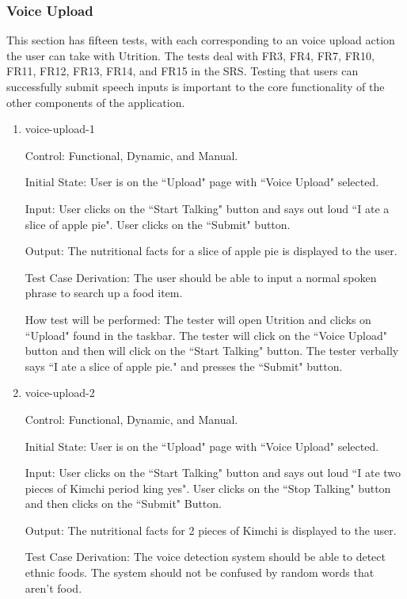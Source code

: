 \documentclass[12pt, titlepage]{article}
\begin{document}
	\subsubsection{Voice Upload}
	This section has fifteen tests, with each corresponding to an voice upload action the user can take with Utrition. The tests deal with FR3, FR4, FR7, FR10, FR11, FR12, FR13, FR14, and FR15 in the SRS. 
	Testing that users can successfully submit speech inputs is 
	important to the core functionality of the other components of the 
	application.
	
	\begin{enumerate}
	\item{voice-upload-1\\}
	
	Control: Functional, Dynamic, and Manual.
	
	Initial State: User is on the ``Upload" page with ``Voice Upload" selected.
	
	Input: User clicks on the ``Start Talking" button and says out loud ``I ate a slice of apple pie". User clicks on the ``Submit" button.
	
	Output: The nutritional facts for a slice of apple pie is displayed to the user.
	
	Test Case Derivation: The user should be able to input a normal spoken phrase to search up a food item.
	
	How test will be performed: The tester will open Utrition and clicks on ``Upload" found in the taskbar. The tester will click on the ``Voice Upload" button and then will click on the ``Start Talking" button. The tester verbally says ``I ate a slice of apple pie." and presses the ``Submit" button.
	
	\item{voice-upload-2\\}
	
	Control: Functional, Dynamic, and Manual.
	
	Initial State: User is on the ``Upload" page with ``Voice Upload" selected.
	
	Input: User clicks on the ``Start Talking" button and says out loud ``I ate two pieces of Kimchi period king yes". User clicks on the ``Stop Talking" button and then clicks on the ``Submit" Button.
	
	Output: The nutritional facts for 2 pieces of Kimchi is displayed to the user.
	
	Test Case Derivation: The voice detection system should be able to detect ethnic foods. The system should not be confused by random words that aren't food.
	

\end{enumerate}
\end{document}
